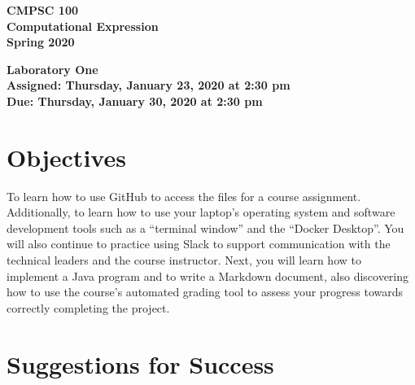 \documentclass[11pt]{article}
\newcommand{\assignmentduedate}{January 30}
\newcommand{\assignmentassignedate}{January 23}
\newcommand{\assignmentnumber}{One}
\newcommand{\labyear}{2020}
\newcommand{\labday}{Thursday}
\newcommand{\labtime}{2:30 pm}
\newcommand{\assigneddate}{Assigned: \labday, \assignmentassignedate, \labyear{} at \labtime{}}
\newcommand{\duedate}{Due: \labday, \assignmentduedate, \labyear{} at \labtime{}}
\newcommand{\labtitle}[1]
{
  \begin{center}
    \begin{center}
      \bf
      CMPSC 100\\Computational Expression\\
      Spring 2020\\
      \medskip
    \end{center}
    \bf
    #1
  \end{center}
}
\begin{document}
\thispagestyle{empty}

\labtitle{Laboratory \assignmentnumber{} \\ \assigneddate{} \\ \duedate{}}

\section*{Objectives}

To learn how to use GitHub to access the files for a course assignment.
Additionally, to learn how to use your laptop's operating system and software
development tools such as a ``terminal window'' and the ``Docker Desktop''. You
will also continue to practice using Slack to support communication with the
technical leaders and the course instructor. Next, you will learn how to
implement a Java program and to write a Markdown document, also discovering how
to use the course's automated grading tool to assess your progress towards
correctly completing the project.

\section*{Suggestions for Success}
\end{document}

